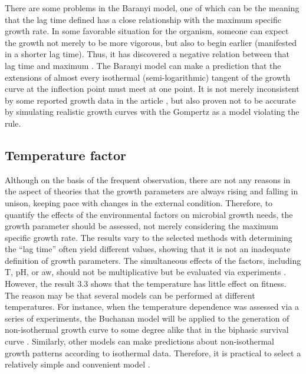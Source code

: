 \documentclass[11pt]{article}
\begin{document}
There are some problems in the Baranyi model, one of which can be the meaning that the lag time defined has a close relationship with the maximum specific growth rate. In some favorable situation for the organism, someone can expect the growth not merely to be more vigorous, but also to begin earlier (manifested in a shorter lag time). Thus, it has discovered a negative relation between that lag time and maximum \citep{R25}. The Baranyi model can make a prediction that the extensions of almost every isothermal (semi-logarithmic) tangent of the growth curve at the inflection point must meet at one point. It is not merely inconsistent by some reported growth data in the article \citep{R8, R27}, but also proven not to be accurate by simulating realistic growth curves with the Gompertz as a model violating the rule. 
 
\subsection{Temperature factor}
Although on the basis of the frequent observation, there are not any reasons in the aspect of theories that the growth parameters are always rising and falling in unison, keeping pace with changes in the external condition. Therefore, to quantify the effects of the environmental factors on microbial growth needs, the growth parameter should be assessed, not merely considering the maximum specific growth rate. The results vary to the selected methods with determining the “lag time” often yield different values, showing that it is not an inadequate definition of growth parameters. The simultaneous effects of the factors, including T, pH, or aw, should not be multiplicative but be evaluated via experiments \citep{R6}. However, the result 3.3 shows that the temperature has little effect on fitness. The reason may be that several models can be performed at different temperatures. For instance, when the temperature dependence was assessed via a series of experiments, the Buchanan model will be applied to the generation of non-isothermal growth curve to some degree alike that in the biphasic survival curve \citep{R28}. Similarly, other models can make predictions about non-isothermal growth patterns according to isothermal data. Therefore, it is practical to select a relatively simple and convenient model \citep{R6}.
\end{document}
